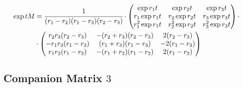 \documentclass[12pt,a4paper]{article}
\begin{document}
\begin{align}
\exp tM &=  \cfrac{1}{(r_1 - r_2)(r_1 - r_3)(r_2 - r_3)} \cdot \left(\begin{matrix}\exp{r_1 t} & \exp{r_2 t} & \exp{r_3 t} \\ r_1 \exp{r_1 t} & r_2 \exp{r_2 t} & r_3 \exp{r_3 t}  \\ r_1^2 \exp{r_1 t} & r_2^2 \exp{r_2 t} & r_3^2 \exp{r_3 t}  \end{matrix} \right) \cdot \nonumber \\
&\cdot \left(\begin{matrix}r_2 r_3(r_2 - r_3) & - (r_2 + r_3)(r_2 - r_3) & 2(r_2 - r_3) \\ -r_1 r_3(r_1 - r_3) & (r_1 + r_3)(r_1 - r_3) & -2(r_1 - r_3) \\ r_1 r_2(r_1 - r_2) & -(r_1 + r_2)(r_1 - r_2) & 2(r_1 - r_2) \end{matrix} \right)
\end{align}

\subsection{Companion Matrix $3$}
\end{document}
